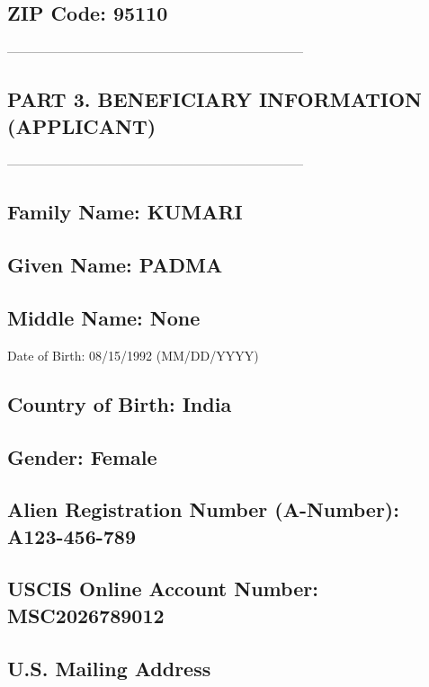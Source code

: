 \subsection*{ZIP Code: 95110}

-----------------------------------------------------------------------

\subsection*{PART 3. BENEFICIARY INFORMATION (APPLICANT)}

-----------------------------------------------------------------------

\subsection*{Family Name: KUMARI}

\subsection*{Given Name: PADMA}

\subsection*{Middle Name: None}

Date of Birth: 08/15/1992 (MM/DD/YYYY)

\subsection*{Country of Birth: India}

\subsection*{Gender: Female}

\subsection*{Alien Registration Number (A-Number): A123-456-789}

\subsection*{USCIS Online Account Number: MSC2026789012}

\subsection*{U.S. Mailing Address}

